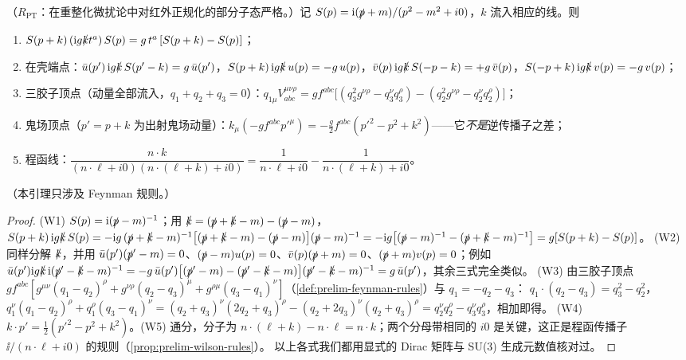 \begin{lemma}\label{lem:method-ward-elementary}
（$R_{\mathrm{PT}}$：在重整化微扰论中对红外正规化的部分子态严格。）记 $S(p)=\mathrm{i}(\slashed{p}+m)/(p^2-m^2+i0)$，$k$ 流入相应的线。则
\begin{enumerate}[label=(W\arabic*),leftmargin=2.6em,itemsep=1pt,topsep=2pt]
\item $S(p+k)\,(\mathrm{i} g\slashed{k}t^a)\,S(p)=g\,t^a\,[S(p+k)-S(p)]$；
\item 在壳端点：$\bar u(p')\,\mathrm{i} g\slashed{k}\,S(p'-k)=g\,\bar u(p')$，$S(p+k)\,\mathrm{i} g\slashed{k}\,u(p)=-g\,u(p)$，$\bar v(p)\,\mathrm{i} g\slashed{k}\,S(-p-k)=+g\,\bar v(p)$，$S(-p+k)\,\mathrm{i} g\slashed{k}\,v(p)=-g\,v(p)$；
\item 三胶子顶点（动量全部流入，$q_1+q_2+q_3=0$）：$q_{1\mu}V^{\mu\nu\rho}_{abc}=gf^{abc}\bigl[(q_3^2g^{\nu\rho}-q_3^\nu q_3^\rho)-(q_2^2g^{\nu\rho}-q_2^\nu q_2^\rho)\bigr]$；
\item 鬼场顶点（$p'=p+k$ 为出射鬼场动量）：$k_\mu(-gf^{abc}p'^\mu)=-\frac g2f^{abc}(p'^2-p^2+k^2)$——它\emph{不是}逆传播子之差；
\item 程函线：$\dfrac{n\cdot k}{(n\cdot\ell+i0)(n\cdot(\ell+k)+i0)}=\dfrac1{n\cdot\ell+i0}-\dfrac1{n\cdot(\ell+k)+i0}$。
\end{enumerate}
（本引理只涉及 Feynman 规则。）
\end{lemma}

\begin{proof}
(W1) $S(p)=\mathrm{i}(\slashed{p}-m)^{-1}$；用 $\slashed{k}=(\slashed{p}+\slashed{k}-m)-(\slashed{p}-m)$，
$S(p+k)\,\mathrm{i} g\slashed{k}\,S(p)=-\mathrm{i} g\,(\slashed{p}+\slashed{k}-m)^{-1}\bigl[(\slashed{p}+\slashed{k}-m)-(\slashed{p}-m)\bigr](\slashed{p}-m)^{-1}=-\mathrm{i} g\bigl[(\slashed{p}-m)^{-1}-(\slashed{p}+\slashed{k}-m)^{-1}\bigr]=g[S(p+k)-S(p)]$。
(W2) 同样分解 $\slashed{k}$，并用 $\bar u(p')(\slashed{p}'-m)=0$、$(\slashed{p}-m)u(p)=0$、$\bar v(p)(\slashed{p}+m)=0$、$(\slashed{p}+m)v(p)=0$；例如
$\bar u(p')\mathrm{i} g\slashed{k}\,\mathrm{i}(\slashed{p}'-\slashed{k}-m)^{-1}=-g\,\bar u(p')\bigl[(\slashed{p}'-m)-(\slashed{p}'-\slashed{k}-m)\bigr](\slashed{p}'-\slashed{k}-m)^{-1}=g\,\bar u(p')$，其余三式完全类似。
(W3) 由三胶子顶点 $gf^{abc}[g^{\mu\nu}(q_1-q_2)^\rho+g^{\nu\rho}(q_2-q_3)^\mu+g^{\rho\mu}(q_3-q_1)^\nu]$（\cref{def:prelim-feynman-rules}）与 $q_1=-q_2-q_3$：
$q_1\cdot(q_2-q_3)=q_3^2-q_2^2$，$q_1^\nu(q_1-q_2)^\rho+q_1^\rho(q_3-q_1)^\nu=(q_2+q_3)^\nu(2q_2+q_3)^\rho-(q_2+2q_3)^\nu(q_2+q_3)^\rho=q_2^\nu q_2^\rho-q_3^\nu q_3^\rho$，相加即得。
(W4) $k\cdot p'=\frac12(p'^2-p^2+k^2)$。(W5) 通分，分子为 $n\cdot(\ell+k)-n\cdot\ell=n\cdot k$；两个分母带相同的 $i0$ 是关键，这正是程函传播子 $\ii/(n\cdot\ell+i0)$ 的规则（\cref{prop:prelim-wilson-rules}）。
以上各式我们都用显式的 Dirac 矩阵与 SU(3) 生成元数值核对过。%
\end{proof}

